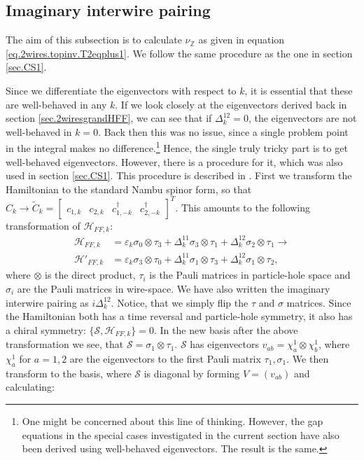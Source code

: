 \subsection{Imaginary interwire pairing}
\label{subsec.2wires_CSinv_Delta12imag}
The aim of this subsection is to calculate $\nu_{\mathbb{Z}}$ as given in equation \eqref{eq.2wires.topinv.T2eqplus1}. We follow the same procedure as the one in section \ref{sec.CS1}. 

Since we differentiate the eigenvectors with respect to $k$, it is essential that these are well-behaved in any $k$. If we look closely at the eigenvectors derived back in section \ref{sec.2wiresgrandHFF}, we can see that if $\Delta^{12}_k = 0$, the eigenvectors are not well-behaved in $k = 0$. Back then this was no issue, since a single problem point in the integral makes no difference.\footnote{One might be concerned about this line of thinking. However, the gap equations in the special cases investigated in the current section have also been derived using well-behaved eigenvectors. The result is the same.} Hence, the single truly tricky part is to get well-behaved eigenvectors. However, there is a procedure for it, which was also used in section \ref{sec.CS1}. This procedure is described in \cite{Ryu.Topology}. First we transform the Hamiltonian to the standard Nambu spinor form, so that $C_k \to \tilde{C}_k = \begin{bmatrix} c_{1,k} & c_{2,k} & c^\dagger_{1,-k} & c^\dagger_{2,-k}  \end{bmatrix}^{T}$. This amounts to the following transformation of $\mathcal{H}_{FF,k}$:
\begin{align}
\mathcal{H}_{FF,k} &= \varepsilon_k \sigma_0 \otimes \tau_3 + \Delta^{11}_k \sigma_3 \otimes \tau_1 + \Delta^{12}_k \sigma_2 \otimes \tau_1 \to \nonumber \\
\mathcal{H}'_{FF,k} &= \varepsilon_k \sigma_3 \otimes \tau_0 + \Delta^{11}_k \sigma_1 \otimes \tau_3 + \Delta^{12}_k \sigma_1 \otimes \tau_2, \nonumber 
\end{align}
where $\otimes$ is the direct product, $\tau_i$ is the Pauli matrices in particle-hole space and $\sigma_i$ are the Pauli matrices in wire-space. We have also written the imaginary interwire pairing as $i\Delta^{12}_k$. Notice, that we simply flip the $\tau$ and $\sigma$ matrices. Since the Hamiltonian both has a time reversal and particle-hole symmetry, it also has a chiral symmetry: $\{\mathcal{S}, \mathcal{H}_{FF,k}\} = 0$. In the new basis after the above transformation we see, that $\mathcal{S} = \sigma_1\otimes \tau_1$. $\mathcal{S}$ has eigenvectors $v_{ab} = \chi^{1}_a\otimes \chi^{1}_b$, where $\chi^{1}_a$ for $a = 1,2$ are the eigenvectors to the first Pauli matrix $\tau_1, \sigma_1$. We then transform to the basis, where $\mathcal{S}$ is diagonal by forming $V = (v_{ab})$ and calculating:
